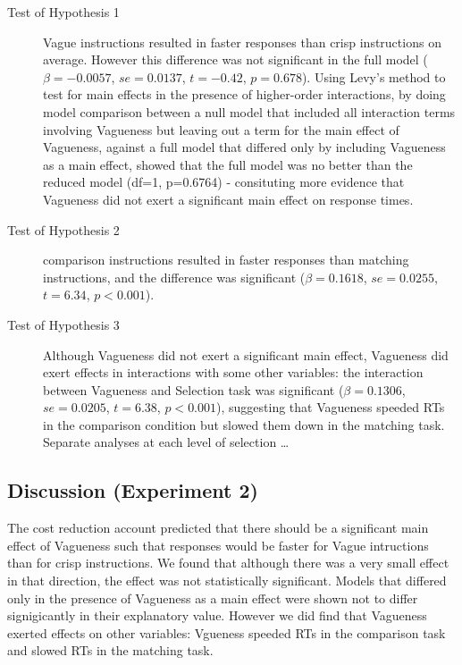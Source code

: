 \begin{description} %
	\item [Test of Hypothesis 1] Vague instructions resulted in faster responses than crisp instructions on average. However this difference was not significant in the full model ($\beta=-0.0057$, $se=0.0137$, $t=-0.42$, $p=0.678$). Using Levy's method \citep{Levy:MainEffectsInteractions} to test for main effects in the presence of higher-order interactions, by doing model comparison between a null model that included all interaction terms involving Vagueness but leaving out a term for the main effect of Vagueness, against a full model that differed only by including Vagueness as a main effect, showed that the full model was no better than the reduced model (df=1, p=0.6764) - consituting more evidence that Vagueness did not exert a significant main effect on response times. 
	\item [Test of Hypothesis 2] comparison instructions resulted in faster responses than matching instructions, and the difference was significant ($\beta=0.1618$, $se=0.0255$, $t=6.34$, $p<0.001$).
	\item [Test of Hypothesis 3] Although Vagueness did not exert a significant main effect, Vagueness did exert effects in interactions with some other variables: the interaction between Vagueness and Selection task  was significant ($\beta=0.1306$, $se=0.0205$, $t=6.38$, $p<0.001$), suggesting that Vagueness speeded RTs in the comparison condition but slowed them down in the matching task. 
	Separate analyses at each level of selection \ldots
%
\end{description}

\subsection{Discussion (Experiment 2)}
The cost reduction account predicted that there should be a significant main effect of Vagueness such that responses would be faster for Vague intructions than for crisp instructions. We found that although there was a very small effect in that direction, the effect was not statistically significant. Models that differed only in the presence of Vagueness as a main effect were shown not to differ signigicantly in their explanatory value. However we did find that Vagueness exerted effects on other variables: Vgueness speeded RTs in the comparison task and slowed RTs in the matching task.


